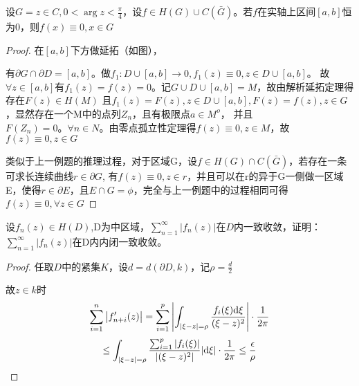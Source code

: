 \begin{eg}
	\color{blue}设$G={z\in C,0<\arg z<\frac{\pi}{4}}$，设$f\in H(G)\cup C(\bar G)$。若$f$在实轴上区间$[a,b]$恒为$0$，则$f(x)\equiv 0,x\in G$
	
	\color{black}
	\begin{proof}
		在$[a,b]$下方做延拓（如图），
		
		有$\partial G \cap \partial D=[a,b]$。做$f_{1}:D\cup [a,b] \to {0} ,f_{1}(z)\equiv 0,z\in D\cup [a,b]$。
		故$\forall z\in [a,b]$有$f_{1}(z)=f(z)=0$。记$G\cup D \cup [a,b]=M$，故由解析延拓定理得存在$F(z)\in H(M)$
		且$f_{1}(z)=F(z),z\in D\cup [a,b],F(z)=f(z),z\in G$，显然存在一个M中的点列${Z_{n}}$，且有极限点$a\in M^{o}$，
		并且$F(Z_{n})=0。\forall n\in N。$由零点孤立性定理得$f(z)\equiv 0,z\in M$，故$f(z)\equiv 0,z\in G$
		
		类似于上一例题的推理过程，对于区域G，设$f\in H(G)\cap C(\bar{G})$，若存在一条可求长连续曲线$r \in \partial G$,
		有$f(z)\equiv 0,z\in r$，并且可以在r的异于G一侧做一区域E，使得$r\in \partial E$，且$E\cap G=\phi$，完全与上一例题中的过程相同可得$f(z)\equiv 0,\forall z\in G$
	\end{proof}
\end{eg}
\begin{eg}
	\color{blue}设$f_{n}(z)\in H(D)$,D为中区域，$\sum_{n=1}^{\infty}|f_{n}(z)|$在$D$内一致收敛，证明：$\sum_{n=1}^{\infty}|f_{n}(z)|$在D内内闭一致收敛。
	
	\color{black}
	\begin{proof}
		任取$D$中的紧集$K$，设$d=d(\partial D,k)$，记$\rho=\frac{d}{2}$
		
		故$z\in k$时
		\begin{equation*}
		\sum\limits_{i=1}^{n}\left|f'_{n+i}(z)\right|=\sum\limits_{i=1}^{p}\left|\int_{|\xi -z|=\rho }\dfrac{f_{i}(\xi)\mathrm{d}\xi}{(\xi -z)^{2}}\right|\cdot \dfrac{1}{2\pi}
		\end{equation*}
		\begin{equation*}
		\le \int_{|\xi -z|=\rho }\frac{\sum_{i=1}^{p}|f_{i}(\xi)|}{|(\xi -z)^{2}|}|\mathrm{d}\xi|\cdot \dfrac{1}{2\pi}\le \dfrac{\epsilon}{\rho}
		\end{equation*}
	\end{proof}
\end{eg}
